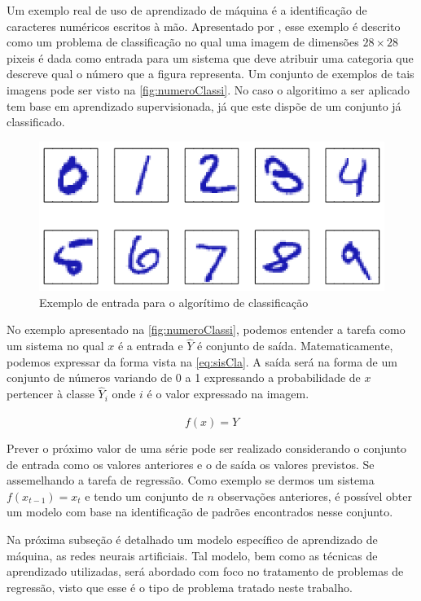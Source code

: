 \documentclass[
    12pt,
    oneside,
    a4paper,
    english,
    brazil
]{abntex2}
\begin{document}
Um    exemplo   real    de    uso    de   aprendizado    de    máquina   é    a
identificação  de   caracteres  numéricos  escritos  à   mão.  Apresentado  por
,  esse  exemplo é  descrito  como  um problema  de
classificação no qual uma imagem de dimensões $28 \times 28$ pixeis é dada como
entrada para  um sistema que  deve atribuir uma  categoria que descreve  qual o
número que  a figura representa. Um  conjunto de exemplos de  tais imagens pode
ser visto  na \autoref{fig:numeroClassi}. No  caso o algoritimo a  ser aplicado
tem base  em aprendizado supervisionada, já  que este dispõe de  um conjunto já
classificado.

\begin{figure}[ht]
    \centering
    \caption{Exemplo de entrada para o algorítimo de
        classificação}\label{fig:numeroClassi}
    \includegraphics[width=.5\linewidth]{images/numeroClassificacao.png}
\end{figure}

No exemplo apresentado na \autoref{fig:numeroClassi}, podemos entender a tarefa
como  um sistema  no qual  $x$ é  a entrada  e $\hat{Y}$  é conjunto  de saída.
Matematicamente,  podemos expressar  da forma  vista na  \autoref{eq:sisCla}. A
saída será na forma  de um conjunto de números variando de 0  a 1 expressando a
probabilidade  de  $x$ pertencer  à  classe  $\hat{Y}_i$  onde  $i$ é  o  valor
expressado na imagem.

\begin{equation}
    \label{eq:sisCla}
    f(x) = \hat{Y}
\end{equation}

Prever o próximo valor de uma  série pode ser realizado considerando o conjunto
de entrada  como os valores  anteriores e o de  saída os valores  previstos. Se
assemelhando  a  tarefa  de  regressão.  Como  exemplo  se  dermos  um  sistema
$f{(x_{t-1})}  = x_t$  e tendo  um conjunto  de $n$  observações anteriores,  é
possível obter um modelo com base na identificação de padrões encontrados nesse
conjunto.

Na próxima subseção é detalhado um modelo específico de aprendizado de máquina,
as redes neurais  artificiais. Tal modelo, bem como as  técnicas de aprendizado
utilizadas, será  abordado com  foco no tratamento  de problemas  de regressão,
visto que esse é o tipo de problema tratado neste trabalho.
\end{document}
